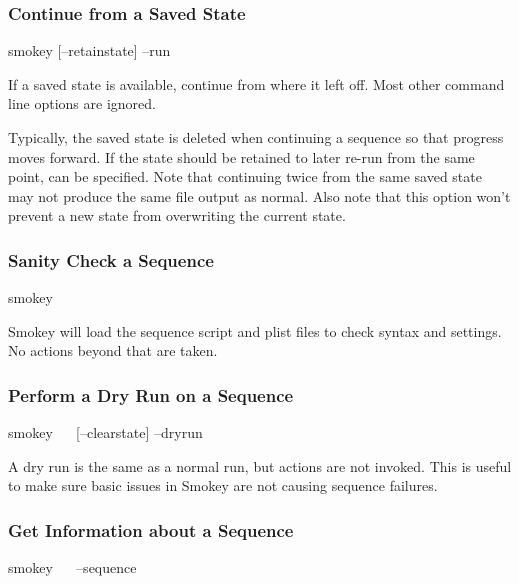 \subsubsection{Continue from a Saved State}

\begin{CommandLine}
smokey [--retainstate] --run
\end{CommandLine}

If a saved state is available, continue from where it left off.  Most other
command line options are ignored.

Typically, the saved state is deleted when continuing a sequence so that
progress moves forward.  If the state should be retained to later re-run from
the same point,  can be specified.  Note that continuing
twice from the same saved state may not produce the same file output as normal.
Also note that this option won't prevent a new state from overwriting the
current state.

\subsubsection{Sanity Check a Sequence}

\begin{CommandLine}
smokey ~~
\end{CommandLine}

Smokey will load the sequence script and plist files to check syntax and
settings.  No actions beyond that are taken.

\subsubsection{Perform a Dry Run on a Sequence}

\begin{CommandLine}
smokey ~~ [--clearstate] --dryrun
\end{CommandLine}

A dry run is the same as a normal run, but actions are not invoked.  This is
useful to make sure basic issues in Smokey are not causing sequence failures.

\subsubsection{Get Information about a Sequence}

\begin{CommandLine}
smokey ~~ --sequence
\end{CommandLine}

